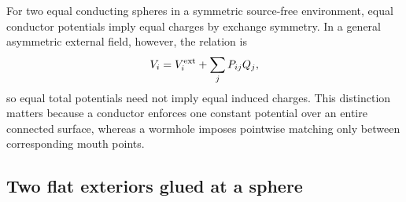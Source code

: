 \documentclass[journal,a4paper]{IEEEtran}
\begin{document}
For two equal conducting spheres in a symmetric source-free environment, equal conductor potentials imply equal charges by exchange symmetry. In a general asymmetric external field, however, the relation is
\begin{equation}
    V_i=V_i^{\rm ext}+\sum_j P_{ij}Q_j,
\end{equation}
so equal total potentials need not imply equal induced charges. This distinction matters because a conductor enforces one constant potential over an entire connected surface, whereas a wormhole imposes pointwise matching only between corresponding mouth points.

\subsection{Two flat exteriors glued at a sphere}
\end{document}
